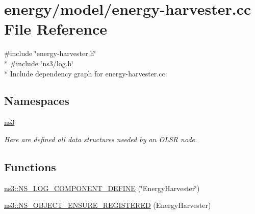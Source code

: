 \hypertarget{energy-harvester_8cc}{}\section{energy/model/energy-\/harvester.cc File Reference}
\label{energy-harvester_8cc}
{\ttfamily \#include \char`\"{}energy-\/harvester.\+h\char`\"{}}\\*
{\ttfamily \#include \char`\"{}ns3/log.\+h\char`\"{}}\\*
Include dependency graph for energy-\/harvester.cc\+:
\subsection*{Namespaces}
\begin{DoxyCompactItemize}
\item 
 \hyperlink{namespacens3}{ns3}
\begin{DoxyCompactList}\small\item\em Here are defined all data structures needed by an O\+L\+SR node. \end{DoxyCompactList}\end{DoxyCompactItemize}
\subsection*{Functions}
\begin{DoxyCompactItemize}
\item 
\hyperlink{namespacens3_a5833c3b1ffbaf246d1470245d7b4278a}{ns3\+::\+N\+S\+\_\+\+L\+O\+G\+\_\+\+C\+O\+M\+P\+O\+N\+E\+N\+T\+\_\+\+D\+E\+F\+I\+NE} (\char`\"{}Energy\+Harvester\char`\"{})
\item 
\hyperlink{namespacens3_a0026d695251bd9bc99c2d9316ae95fcc}{ns3\+::\+N\+S\+\_\+\+O\+B\+J\+E\+C\+T\+\_\+\+E\+N\+S\+U\+R\+E\+\_\+\+R\+E\+G\+I\+S\+T\+E\+R\+ED} (Energy\+Harvester)
\end{DoxyCompactItemize}

